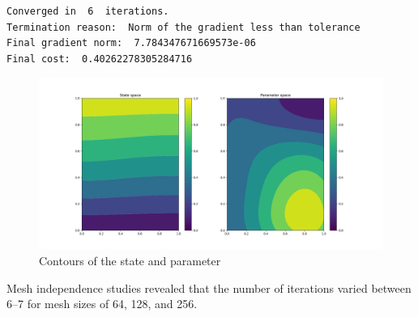 \begin{itemize}
\begin{lstlisting}[language=bash]
Converged in  6  iterations.
Termination reason:  Norm of the gradient less than tolerance
Final gradient norm:  7.784347671669573e-06
Final cost:  0.40262278305284716
    \end{lstlisting}
    \begin{figure}[th]
        \centering
        \includegraphics[width=1.0\textwidth]{figures/space.png}
        \caption{Contours of the state and parameter}
        \label{figure:space}
    \end{figure}
    Mesh independence studies revealed that the number of iterations varied between 6--7 for mesh sizes of 64, 128, and 256.
\end{itemize}